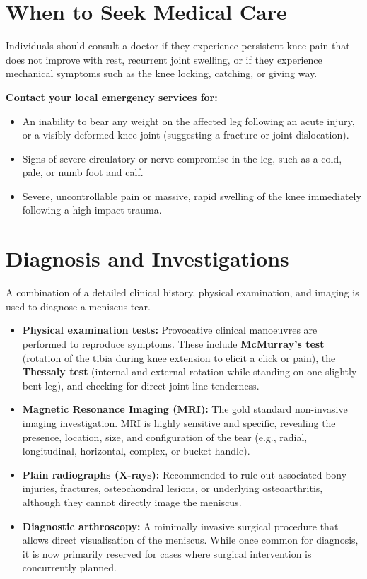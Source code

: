\section*{When to Seek Medical Care}
Individuals should consult a doctor if they experience persistent knee pain that does not improve with rest, recurrent joint swelling, or if they experience mechanical symptoms such as the knee locking, catching, or giving way.

\textbf{Contact your local emergency services for:}
\begin{itemize}
    \item An inability to bear any weight on the affected leg following an acute injury, or a visibly deformed knee joint (suggesting a fracture or joint dislocation).
    \item Signs of severe circulatory or nerve compromise in the leg, such as a cold, pale, or numb foot and calf.
    \item Severe, uncontrollable pain or massive, rapid swelling of the knee immediately following a high-impact trauma.
\end{itemize}

\section*{Diagnosis and Investigations}
A combination of a detailed clinical history, physical examination, and imaging is used to diagnose a meniscus tear.
\begin{itemize}
    \item \textbf{Physical examination tests:} Provocative clinical manoeuvres are performed to reproduce symptoms. These include \textbf{McMurray's test} (rotation of the tibia during knee extension to elicit a click or pain), the \textbf{Thessaly test} (internal and external rotation while standing on one slightly bent leg), and checking for direct joint line tenderness.
    \item \textbf{Magnetic Resonance Imaging (MRI):} The gold standard non-invasive imaging investigation. MRI is highly sensitive and specific, revealing the presence, location, size, and configuration of the tear (e.g., radial, longitudinal, horizontal, complex, or bucket-handle).
    \item \textbf{Plain radiographs (X-rays):} Recommended to rule out associated bony injuries, fractures, osteochondral lesions, or underlying osteoarthritis, although they cannot directly image the meniscus.
    \item \textbf{Diagnostic arthroscopy:} A minimally invasive surgical procedure that allows direct visualisation of the meniscus. While once common for diagnosis, it is now primarily reserved for cases where surgical intervention is concurrently planned.
\end{itemize}

